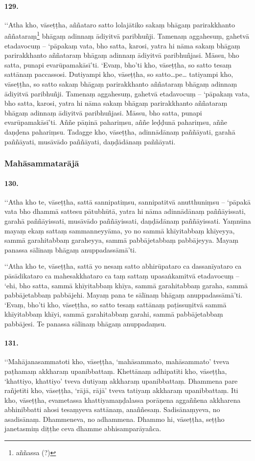 \paragraph{129.} ‘‘Atha kho, vāseṭṭha, aññataro satto lolajātiko sakaṃ bhāgaṃ parirakkhanto aññataraṃ\footnote{aññassa (?)} bhāgaṃ adinnaṃ ādiyitvā paribhuñji. Tamenaṃ aggahesuṃ, gahetvā etadavocuṃ – ‘pāpakaṃ vata, bho satta, karosi, yatra hi nāma sakaṃ bhāgaṃ parirakkhanto aññataraṃ bhāgaṃ adinnaṃ ādiyitvā paribhuñjasi. Māssu, bho satta, punapi evarūpamakāsī’ti. ‘Evaṃ, bho’ti kho, vāseṭṭha, so satto tesaṃ sattānaṃ paccassosi. Dutiyampi kho, vāseṭṭha, so satto…pe… tatiyampi kho, vāseṭṭha, so satto sakaṃ bhāgaṃ parirakkhanto aññataraṃ bhāgaṃ adinnaṃ ādiyitvā paribhuñji. Tamenaṃ aggahesuṃ, gahetvā etadavocuṃ – ‘pāpakaṃ vata, bho satta, karosi, yatra hi nāma sakaṃ bhāgaṃ parirakkhanto aññataraṃ bhāgaṃ adinnaṃ ādiyitvā paribhuñjasi. Māssu, bho satta, punapi evarūpamakāsī’ti. Aññe pāṇinā pahariṃsu, aññe leḍḍunā pahariṃsu, aññe daṇḍena pahariṃsu. Tadagge kho, vāseṭṭha, adinnādānaṃ paññāyati, garahā paññāyati, musāvādo paññāyati, daṇḍādānaṃ paññāyati.

\subsubsection{Mahāsammatarājā}

\paragraph{130.} ‘‘Atha kho te, vāseṭṭha, sattā sannipatiṃsu, sannipatitvā anutthuniṃsu – ‘pāpakā vata bho dhammā sattesu pātubhūtā, yatra hi nāma adinnādānaṃ paññāyissati, garahā paññāyissati, musāvādo paññāyissati, daṇḍādānaṃ paññāyissati. Yaṃnūna mayaṃ ekaṃ sattaṃ sammanneyyāma, yo no sammā khīyitabbaṃ khīyeyya, sammā garahitabbaṃ garaheyya, sammā pabbājetabbaṃ pabbājeyya. Mayaṃ panassa sālīnaṃ bhāgaṃ anuppadassāmā’ti.

‘‘Atha kho te, vāseṭṭha, sattā yo nesaṃ satto abhirūpataro ca dassanīyataro ca pāsādikataro ca mahesakkhataro ca taṃ sattaṃ upasaṅkamitvā etadavocuṃ – ‘ehi, bho satta, sammā khīyitabbaṃ khīya, sammā garahitabbaṃ garaha, sammā pabbājetabbaṃ pabbājehi. Mayaṃ pana te sālīnaṃ bhāgaṃ anuppadassāmā’ti. ‘Evaṃ, bho’ti kho, vāseṭṭha, so satto tesaṃ sattānaṃ paṭissuṇitvā sammā khīyitabbaṃ khīyi, sammā garahitabbaṃ garahi, sammā pabbājetabbaṃ pabbājesi. Te panassa sālīnaṃ bhāgaṃ anuppadaṃsu.

\paragraph{131.} ‘‘Mahājanasammatoti kho, vāseṭṭha, ‘mahāsammato, mahāsammato’ tveva paṭhamaṃ akkharaṃ upanibbattaṃ. Khettānaṃ adhipatīti kho, vāseṭṭha, ‘khattiyo, khattiyo’ tveva dutiyaṃ akkharaṃ upanibbattaṃ. Dhammena pare rañjetīti kho, vāseṭṭha, ‘rājā, rājā’ tveva tatiyaṃ akkharaṃ upanibbattaṃ. Iti kho, vāseṭṭha, evametassa khattiyamaṇḍalassa porāṇena aggaññena akkharena abhinibbatti ahosi tesaṃyeva sattānaṃ, anaññesaṃ. Sadisānaṃyeva, no asadisānaṃ. Dhammeneva, no adhammena. Dhammo hi, vāseṭṭha, seṭṭho janetasmiṃ diṭṭhe ceva dhamme abhisamparāyañca.

